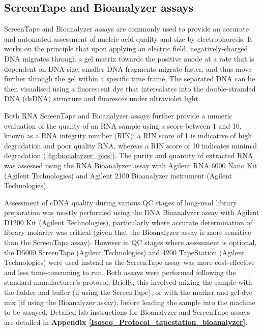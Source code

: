 \subsection{ScreenTape and Bioanalyzer assays}
\label{section:ch2_bioanalyzer} 
ScreenTape and Bioanalyzer assays are commonly used to provide an accurate and automated assessment of nucleic acid quality and size by electrophoresis. It works on the principle that upon applying an electric field, negatively-charged DNA migrates through a gel matrix towards the positive anode at a rate that is dependent on DNA size; smaller DNA fragments migrate faster, and thus move further through the gel within a specific time frame. The separated DNA can be then visualised using a fluorescent dye that intercalates into the double-stranded DNA (dsDNA) structure and fluoresces under ultraviolet light. 

Both RNA ScreenTape and Bioanalyzer assays further provide a numeric evaluation of the quality of an RNA sample using a score between 1 and 10, known as a RNA integrity number (RIN); a RIN score of 1 is indicative of high degradation and poor quality RNA, whereas a RIN score of 10 indicates minimal degradation (\cref{fig:bionalayzer_pics}). The purity and quantity of extracted RNA was assessed using the RNA Bioanalyzer assay with Agilent RNA 6000 Nano Kit (Agilent Technologies) and Agilent 2100 Bioanalyzer instrument (Agilent Technologies). 

Assessment of cDNA quality during various QC stages of long-read library preparation was mostly performed using the DNA Bioanalyzer assay with Agilent D1200 Kit (Agilent Technologies), particularly where accurate determination of library molarity was critical (given that the Bioanalyzer assay is more sensitive than the ScreenTape assay). However in QC stages where assessment is optional, the D5000 ScreenTape (Agilent Technologies) and 4200 TapeStation (Agilent Technologies) were used instead as the ScreenTape assay was more cost-effective and less time-consuming to run. Both assays were performed following the standard manufacturer's protocol. Briefly, this involved mixing the sample with the ladder and buffer (if using the ScreenTape), or with the marker and gel-dye mix (if using the Bioanalyzer assay), before loading the sample into the machine to be assayed. Detailed lab instructions for Bioanalyzer and ScreenTape assays are detailed in \textbf{Appendix \ref{Isoseq_Protocol_tapestation_bioanalyzer}}.

